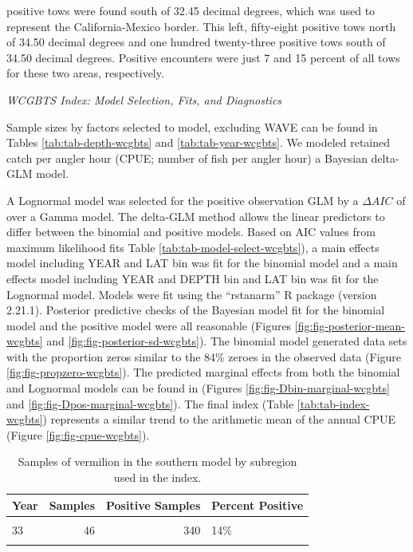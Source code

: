 \documentclass[
  english,
  a4paper,
]{article}
\begin{document}
positive tows were found south of 32.45 decimal degrees,
which was used to represent the California-Mexico border.
This left,
fifty-eight
positive tows north of 34.50 decimal degrees and
one hundred twenty-three
positive tows south of 34.50 decimal degrees.
Positive encounters were just
7 and 15
percent of all tows for these two areas, respectively.

\emph{WCGBTS Index: Model Selection, Fits, and Diagnostics}

Sample sizes by factors selected to model, excluding WAVE can be found in Tables
\ref{tab:tab-depth-wcgbts} and \ref{tab:tab-year-wcgbts}.
We modeled retained catch per angler hour (CPUE; number of fish per angler hour)
a Bayesian delta-GLM model.

A Lognormal model was
selected for the positive observation GLM by
a \(\Delta AIC\) of\\
over a Gamma model.
The delta-GLM
method allows the linear predictors to differ between the binomial and positive models.
Based on AIC values from maximum likelihood fits Table \ref{tab:tab-model-select-wcgbts}),
a main effects model including
YEAR and LAT bin
was fit for the binomial model and a main
effects model including
YEAR and DEPTH bin and LAT bin
was fit for the Lognormal model.
Models were fit using the ``rstanarm'' R package (version 2.21.1). Posterior predictive
checks of the Bayesian model fit for the binomial model and the positive model
were all reasonable (Figures \ref{fig:fig-posterior-mean-wcgbts} and
\ref{fig:fig-posterior-sd-wcgbts}). The binomial model generated data sets with the
proportion zeros similar to the 84\% zeroes in the observed data
(Figure \ref{fig:fig-propzero-wcgbts}). The predicted marginal effects from
both the binomial and Lognormal models can be found in (Figures \ref{fig:fig-Dbin-marginal-wcgbts} and \ref{fig:fig-Dpos-marginal-wcgbts}). The
final index (Table \ref{tab:tab-index-wcgbts})
represents a similar trend to the arithmetic mean of the annual CPUE (Figure \ref{fig:fig-cpue-wcgbts}).

\newpage

\begin{table}

\caption{\label{tab:tab-region-wcgbts}Samples of vermilion in the southern model by subregion used in the index.}
\centering
\begin{tabular}[t]{lrrl}
\toprule
Year & Samples & Positive Samples & Percent Positive\\
\midrule
\cellcolor{gray!6}{32} & \cellcolor{gray!6}{14} & \cellcolor{gray!6}{64} & \cellcolor{gray!6}{22\%}\\
33 & 46 & 340 & 14\%\\
\cellcolor{gray!6}{34} & \cellcolor{gray!6}{58} & \cellcolor{gray!6}{339} & \cellcolor{gray!6}{17\%}\\
\bottomrule
\end{tabular}
\end{table}
\end{document}

